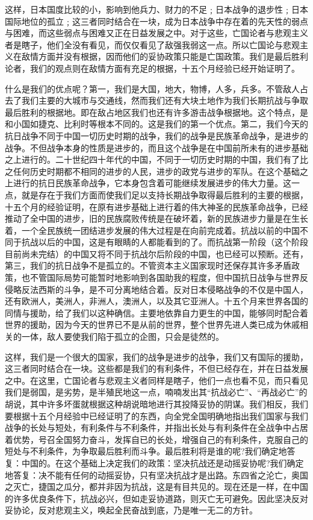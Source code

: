 \documentclass[UTF8, 12pt, a4paper]{ctexrep}
\begin{document}
这样，日本国度比较的小，影响到他兵力、财力的不足﹔日本战争的退步性﹔日本国际地位的孤立﹔这三者同时结合在一块，成为日本战争中存在着的先天性的弱点与困难，而这些弱点与困难又正在日益发展之中。对于这些，亡国论者与悲观主义者是瞎子，他们全没有看见，而仅仅看见了敌强我弱这一点。所以亡国论与悲观主义在敌情方面并没有根据，因而他们的妥协政策只能是亡国政策。我们是最后胜利论者，我们的观点则在敌情方面有充足的根据，十五个月经验已经开始证明了。

什么是我们的优点呢？第一，我们是大国，地大，物博，人多，兵多。不管敌人占去了我们主要的大城市与交通线，然而我们还有大块土地作为我们长期抗战与争取最后胜利的根据地。即在敌占地区我们也还有许多游击战争根据地。这个特点，是和小国如捷克、比利时等根本不同的。这是我们的第一个优点。第二，我们今天的抗日战争不同于中国一切历史时期的战争，我们的战争是民族革命战争，是进步的战争。不但战争本身的性质是进步的，而且这个战争是在中国前所未有的进步基础之上进行的。二十世纪四十年代的中国，不同于一切历史时期的中国，我们有了比之任何历史时期都不相同的进步的人民，进步的政党与进步的军队。在这个基础之上进行的抗日民族革命战争，它本身包含着可能继续发展进步的伟大力量。这一点，就是存在于我们方面而使我们足以支持长期战争取得最后胜利的主要的根据，十五个月的经验证明，在原有进步基础上进行着的伟大神圣的民族革命战争，已经推动了全中国的进步，旧的民族腐败传统是在破坏着，新的民族进步力量是在生长着，一个全民族统一团结进步发展的伟大过程是在向前完成着。抗战以前的中国不同于抗战以后的中国，这是有眼睛的人都能看到的了。而抗战第一阶段（这个阶段目前尚未完结）的中国又将不同于抗战尔后阶段的中国，也已经可以预断。还有，第三，我们的抗日战争不是孤立的。不管资本主义国家现时还保存其许多矛盾政策，也不管国际局势可能暂时地影响到各国助我的程度，但中国抗日战争与世界反侵略反法西斯的斗争，是不可分离地结合着。反对日本侵略战争的不仅是中国人，还有欧洲人，美洲人，非洲人，澳洲人，以及其它亚洲人。十五个月来世界各国的同情与援助，给了我们以这种确信。主要地依靠自力更生的中国，能够同时配合着世界的援助，因为今天的世界已不是从前的世界，整个世界先进人类已成为休戚相关的一体，敌人要使我们陷于孤立的企图，只会是徒然的。

这样，我们是一个很大的国家，我们的战争是进步的战争，我们又有国际的援助，这三者同时结合在一块。这些都是我们的有利条件，不但已经存在，并在日益发展之中。在这里，亡国论者与悲观主义者同样是瞎子，他们一点也看不见，而只看见我们是弱国，是劣势，是半殖民地这一点，喃喃发出其“抗战必亡”、“再战必亡”的胡说，其中许多坏蛋就根据这种胡说暗地进行其投降妥协的阴谋。我们相反，我们要根据十五个月经验中已经证明了的东西，向全党全国明确地指出我们国家与我们战争的长处与短处，有利条件与不利条件，并指出长处与有利条件在全战争中占居着优势，号召全国努力奋斗，发挥自已的长处，增强自己的有利条件，克服自己的短处与不利条件，为争取最后胜利而斗争。最后胜利将是谁的呢?我们确定地答复：中国的。在这个基础上决定我们的政策：坚决抗战还是动摇妥协呢?我们确定地答复：决不能有任何的动摇妥协，只有坚决抗战才是出路。东四省之沦亡，奥国之灭亡，捷国之瓜分，都并非因为抗战，这是有目共见的。现在还是一样，在中国的许多优良条件下，抗战必兴，但如走妥协道路，则灭亡无可避免。因此坚决反对妥协论，反对悲观主义，唤起全民奋战到底，乃是唯一无二的方针。
\end{document}
